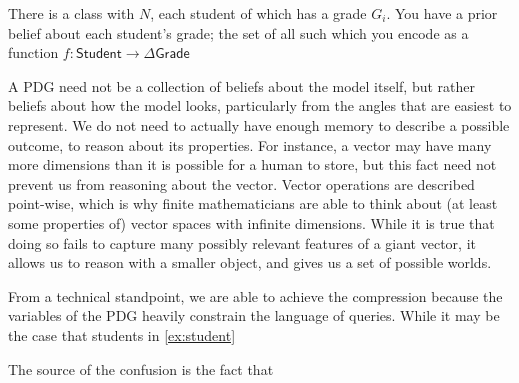 \documentclass{article}
\theoremstyle{plain}
\theoremstyle{definition}
\theoremstyle{remark}
\newcommand{\var}[1]{\mathsf{#1}}
\begin{document}
\begin{example}\label{ex:student}
    There is a class with $N$, each student of which has a grade $G_i$. You have a prior belief about each student's grade; the set of all such which you encode as a function $f:  \var{Student} \to \Delta \var{Grade} $ 
    \begin{center}
    	
    	
    \end{center}    
\end{example}

A PDG need not be a collection of beliefs about the model itself, but rather beliefs about how the model looks, particularly from the angles that are easiest to represent. We do not need to actually have enough memory to describe a possible outcome, to reason about its properties.
For instance, a vector may have many more dimensions than it is possible for a human to store, but this fact need not prevent us from reasoning about the vector. Vector operations are described point-wise, which is why finite mathematicians are able to think about (at least some properties of) vector spaces with infinite dimensions. While it is true that doing so fails to capture many possibly relevant features of a giant vector, it allows us to reason with a smaller object, and gives us a set of possible worlds. 

From a technical standpoint, we are able to achieve the compression because the variables of the PDG heavily constrain the language of queries. While it may be the case that students in \cref{ex:student}




The source of the confusion is the fact that 
\end{document}
